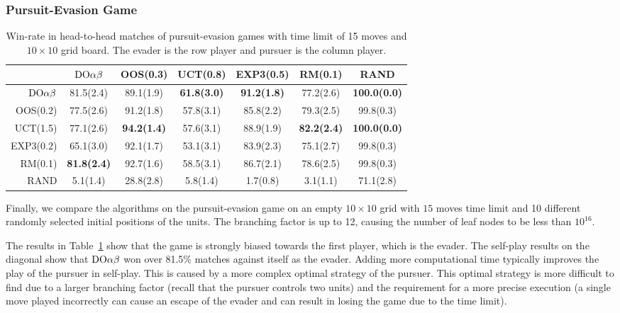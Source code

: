 \subsubsection{Pursuit-Evasion Game}

\begin{table}
\centering
\begin{scriptsize}

\begin{tabular}{|r|cccccc|}\hline
&$\textrm{DO}\alpha\beta$&OOS(0.3)&UCT(0.8)&EXP3(0.5)&RM(0.1)&RAND\\\hline
$\textrm{DO}\alpha\beta$&81.5(2.4)&89.1(1.9)&\textbf{61.8(3.0)}&\textbf{91.2(1.8)}&77.2(2.6)&\textbf{100.0(0.0)}\\
OOS(0.2)&77.5(2.6)&91.2(1.8)&57.8(3.1)&85.8(2.2)&79.3(2.5)&99.8(0.3)\\
UCT(1.5)&77.1(2.6)&\textbf{94.2(1.4)}&57.6(3.1)&88.9(1.9)&\textbf{82.2(2.4)}&\textbf{100.0(0.0)}\\
EXP3(0.2)&65.1(3.0)&92.1(1.7)&53.1(3.1)&83.9(2.3)&75.1(2.7)&99.8(0.3)\\
RM(0.1)&\textbf{81.8(2.4)}&92.7(1.6)&58.5(3.1)&86.7(2.1)&78.6(2.5)&99.8(0.3)\\
RAND&5.1(1.4)&28.8(2.8)&5.8(1.4)&1.7(0.8)&3.1(1.1)&71.1(2.8)\\
\hline
\end{tabular}

\end{scriptsize}
\caption{Win-rate in head-to-head matches of pursuit-evasion games with time limit of 15 moves and $10\times 10$ grid board.
The evader is the row player and pursuer is the column player.}\label{fig:matches:peg}
\end{table}


Finally, we compare the algorithms on the pursuit-evasion game on an empty $10\times 10$ grid with $15$ moves time limit and 10 different randomly selected initial positions of the units. The branching factor is up to 12, causing the number of leaf nodes to be less than $10^{16}$.

The results in Table~\ref{fig:matches:peg} show that the game is strongly biased towards the first player, which is the evader. The self-play results on the diagonal show that $\textrm{DO}\alpha\beta$ won over 81.5\% matches against itself as the evader. Adding more computational time typically improves the play of the pursuer in self-play. This is caused by a more complex optimal strategy of the pursuer. This optimal strategy is more difficult to find due to a larger branching factor (recall that the pursuer controls two units) and the requirement for a more precise execution (a single move played incorrectly can cause an escape of the evader and can result in losing the game due to the time limit).

